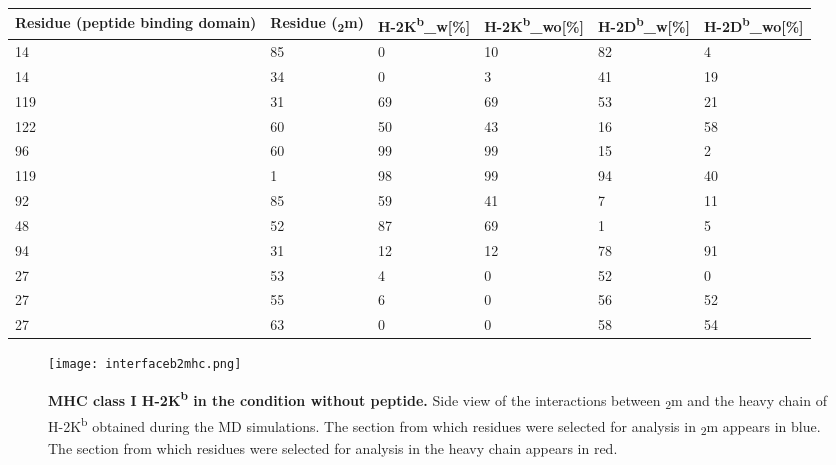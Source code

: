 \documentclass[11pt,twocolumn]{article}
\newcommand{\db}{H-2D\textsuperscript{b}\xspace}
\newcommand{\dbw}{H-2D\textsuperscript{b}\_w\xspace}
\newcommand{\dbwo}{H-2D\textsuperscript{b}\_wo\xspace}
\newcommand{\kb}{H-2K\textsuperscript{b}\xspace}
\newcommand{\kbw}{H-2K\textsuperscript{b}\_w\xspace}
\newcommand{\kbwo}{H-2K\textsuperscript{b}\_wo\xspace}
\newcommand{\angstr}{{\AA}ngstroms\xspace}
\newcommand{\btm}{\textbeta\textsubscript{2}m\xspace}
\begin{document}
   



\begin{table*}
\caption{\textbf{ Compilation of the the interacting residues used for the analysis of \kb and \db, and the percentage of interactions bellow below four \angstr, of each analysed condition.} The residues interacting coming from the peptide binding domain, the residues interacting coming from \btm and the percentage of their interaction which is below four \angstr is analysed in \db and \kb for the condition of with peptide and without peptide}
\label{KBDBinteractions}
\begin{tabularx}{\linewidth}{|X|X|X|X|X|X|}  \hline
Residue (peptide binding domain)&Residue (\btm)&\kbw [\%]&\kbwo [\%]&\dbw [\%]&\dbwo [\%]\\ \hline
14&85&0&10&82&4\\ \hline
14&34&0&3&41&19\\ \hline
119&31&69&69&53&21\\ \hline
122&60&50&43&16&58\\ \hline
96&60&99&99&15&2\\ \hline
119&1&98&99&94&40\\ \hline
92&85&59&41&7&11\\ \hline
48&52&87&69&1&5\\ \hline
94&31&12&12&78&91\\ \hline
27&53&4&0&52&0\\ \hline
27&55&6&0&56&52\\ \hline
27&63&0&0&58&54\\ \hline
\end{tabularx}
\end{table*}



\begin{figure}
\texttt{[image: interfaceb2mhc.png]}
\caption{\textbf{MHC class I \kb in the condition without peptide.} Side view of the interactions between \btm and the heavy chain of \kb obtained during the MD simulations. The section from which residues were selected for analysis in \btm appears in blue. The section from which residues were selected for analysis in the heavy chain appears in red.}
\label{interface}
\end{figure}
\end{document}
